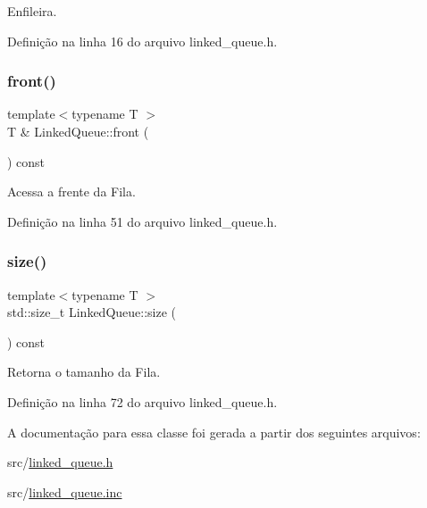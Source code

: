 Enfileira. 



Definição na linha 16 do arquivo linked\+\_\+queue.\+h.

\mbox{\label{classstructures_1_1_linked_queue_aa6d2f0263b390193d2aae72499aa00b4}} 
\subsubsection{\texorpdfstring{front()}{front()}}
{\footnotesize\ttfamily template$<$typename T $>$ \\
T \& Linked\+Queue\+::front (\begin{DoxyParamCaption}{ }\end{DoxyParamCaption}) const}



Acessa a frente da Fila. 



Definição na linha 51 do arquivo linked\+\_\+queue.\+h.

\mbox{\label{classstructures_1_1_linked_queue_a97af1a092fe5f7f15182bf93d1bc396d}} 
\subsubsection{\texorpdfstring{size()}{size()}}
{\footnotesize\ttfamily template$<$typename T $>$ \\
std\+::size\+\_\+t Linked\+Queue\+::size (\begin{DoxyParamCaption}{ }\end{DoxyParamCaption}) const}



Retorna o tamanho da Fila. 



Definição na linha 72 do arquivo linked\+\_\+queue.\+h.



A documentação para essa classe foi gerada a partir dos seguintes arquivos\+:\begin{DoxyCompactItemize}
\item 
src/\mbox{\hyperlink{linked__queue_8h}{linked\+\_\+queue.\+h}}\item 
src/\mbox{\hyperlink{linked__queue_8inc}{linked\+\_\+queue.\+inc}}\end{DoxyCompactItemize}
